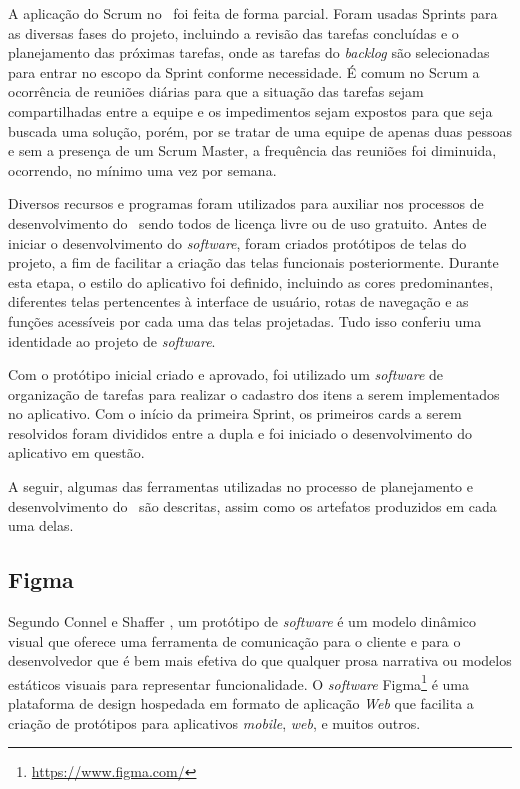 A aplicação do Scrum no \appName\ foi feita de forma parcial. Foram usadas Sprints para as diversas fases do projeto, incluindo a revisão das tarefas concluídas e o planejamento das próximas tarefas, onde as tarefas do \textit{backlog} são selecionadas para entrar no escopo da Sprint conforme necessidade. É comum no Scrum a ocorrência de reuniões diárias para que a situação das tarefas sejam compartilhadas entre a equipe e os impedimentos sejam expostos para que seja buscada uma solução, porém, por se tratar de uma equipe de apenas duas pessoas e sem a presença de um Scrum Master, a frequência das reuniões foi diminuida, ocorrendo, no mínimo uma vez por semana.

Diversos recursos e programas foram utilizados para auxiliar nos processos de desenvolvimento do \appName\, sendo todos de licença livre ou de uso gratuito. Antes de iniciar o desenvolvimento do \textit{software}, foram criados protótipos de telas do projeto, a fim de facilitar a criação das telas funcionais posteriormente. Durante esta etapa, o estilo do aplicativo foi definido, incluindo as cores predominantes, diferentes telas pertencentes à interface de usuário, rotas de navegação e as funções acessíveis por cada uma das telas projetadas. Tudo isso conferiu uma identidade ao projeto de \textit{software}.

Com o protótipo inicial criado e aprovado, foi utilizado um \textit{software} de organização de tarefas para realizar o cadastro dos itens a serem implementados no aplicativo. Com o início da primeira Sprint, os primeiros cards a serem resolvidos foram divididos entre a dupla e foi iniciado o desenvolvimento do aplicativo em questão.

A seguir, algumas das ferramentas utilizadas no processo de planejamento e desenvolvimento do \appName\ são descritas, assim como os artefatos produzidos em cada uma delas.

\subsection{Figma}

Segundo Connel e Shaffer \cite{prototyping}, um protótipo de \textit{software} é um modelo dinâmico visual que oferece uma ferramenta de comunicação para o cliente e para o desenvolvedor que é bem mais efetiva do que qualquer prosa narrativa ou modelos estáticos visuais para representar funcionalidade. O \textit{software} Figma\footnote{\url{https://www.figma.com/}} é uma plataforma de design hospedada em formato de aplicação \textit{Web} que facilita a criação de protótipos para aplicativos \textit{mobile}, \textit{web}, e muitos outros.

